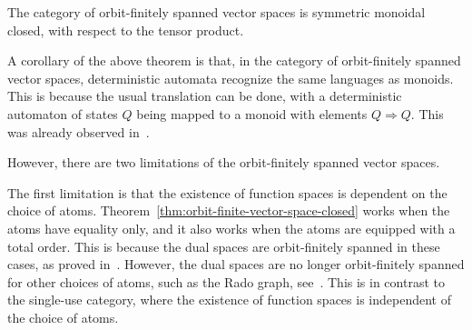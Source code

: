 \documentclass[10pt,a4paper]{amsart}
\numberwithin{equation}{section}
\theoremstyle{plain}
\newcommand{\funspace}[2]{#1 \Rightarrow #2}
\begin{document}


\begin{theorem}\label{thm:orbit-finite-vector-space-closed} The category of orbit-finitely spanned vector spaces is symmetric monoidal closed, with respect to the tensor product.
\end{theorem}


A corollary of the above theorem is that, in the category of orbit-finitely spanned vector spaces, deterministic automata recognize the same languages as monoids. This is because the usual translation can be done, with a deterministic automaton of states $Q$ being mapped to a monoid with elements $\funspace Q Q$. This was already observed in~\cite[Theorem VIII.3]{bojanczykKM21OrbitFiniteVector}.

However, there are two limitations of the orbit-finitely spanned vector spaces. 

The first limitation is that the existence of function spaces is dependent on the choice of atoms. Theorem~\ref{thm:orbit-finite-vector-space-closed}  works when the atoms have equality only, and it also works when the atoms are equipped with a total order. This is because the dual spaces are orbit-finitely spanned in these cases, as proved in~\cite[Corollary VI.5]{bojanczykKM21OrbitFiniteVector}. However, the dual spaces are no longer orbit-finitely spanned for other choices of  atoms, such as the Rado graph, see~\cite[Example 9]{bojanczykKM21OrbitFiniteVector}. This is in contrast to the single-use category, where the existence of function spaces is independent of the choice of atoms. 
\end{document}
